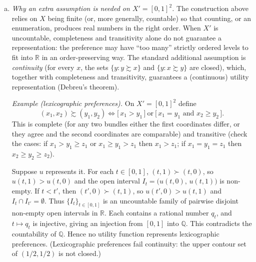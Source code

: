 \documentclass[12pt]{article}
\newcommand{\pref}{\succsim}
\newcommand{\R}{\mathbb{R}}
\begin{document}
\begin{enumerate}
\begin{enumerate}[(a)]
($\Rightarrow$) Suppose $x \pref y$. If $z \in L(y)$ then $y \pref z$, and transitivity gives $x \pref z$, i.e.\ $z \in L(x)$. Thus $L(y) \subseteq L(x)$ and $u(y) \le u(x)$.

($\Leftarrow$) Suppose $u(x) \ge u(y)$ but not $x \pref y$. By completeness $y \pref x$, so $y \succ x$. By the argument just given, $L(x) \subseteq L(y)$. Moreover $y \in L(y)$ (completeness gives $y \pref y$) while $y \notin L(x)$ (since not $x \pref y$). So $L(x) \subsetneq L(y)$ and $u(x) < u(y)$, a contradiction. Hence $x \pref y$.

Therefore $u : X \to \R$ represents $\pref$. (Only finiteness of $X$ is used, so this proves the result for any finite set.)

\item \emph{Why an extra assumption is needed on $X' = [0,1]^2$.}
The construction above relies on $X$ being finite (or, more generally, countable) so that counting, or an enumeration, produces real numbers in the right order. When $X'$ is uncountable, completeness and transitivity alone do not guarantee a representation: the preference may have ``too many'' strictly ordered levels to fit into $\R$ in an order-preserving way. The standard additional assumption is \emph{continuity} (for every $x$, the sets $\{y : y \pref x\}$ and $\{y : x \pref y\}$ are closed), which, together with completeness and transitivity, guarantees a (continuous) utility representation (Debreu's theorem).

\emph{Example (lexicographic preferences).} On $X'=[0,1]^2$ define
\[
(x_1,x_2) \pref (y_1,y_2) \iff \big[\, x_1 > y_1 \,\big] \ \text{or} \ \big[\, x_1 = y_1 \text{ and } x_2 \ge y_2 \,\big].
\]
This is complete (for any two bundles either the first coordinates differ, or they agree and the second coordinates are comparable) and transitive (check the cases: if $x_1>y_1\ge z_1$ or $x_1 \ge y_1 > z_1$ then $x_1>z_1$; if $x_1=y_1=z_1$ then $x_2\ge y_2\ge z_2$).

Suppose $u$ represents it. For each $t \in [0,1]$, $(t,1) \succ (t,0)$, so $u(t,1) > u(t,0)$ and the open interval $I_t = \big(u(t,0),\,u(t,1)\big)$ is non-empty. If $t < t'$, then $(t',0) \succ (t,1)$, so $u(t',0) > u(t,1)$ and $I_t \cap I_{t'} = \emptyset$. Thus $\{I_t\}_{t \in [0,1]}$ is an uncountable family of pairwise disjoint non-empty open intervals in $\R$. Each contains a rational number $q_t$, and $t \mapsto q_t$ is injective, giving an injection from $[0,1]$ into $\mathbb{Q}$. This contradicts the countability of $\mathbb{Q}$. Hence no utility function represents lexicographic preferences. (Lexicographic preferences fail continuity: the upper contour set of $(1/2,1/2)$ is not closed.)
\end{enumerate}


\end{enumerate}
\end{document}
